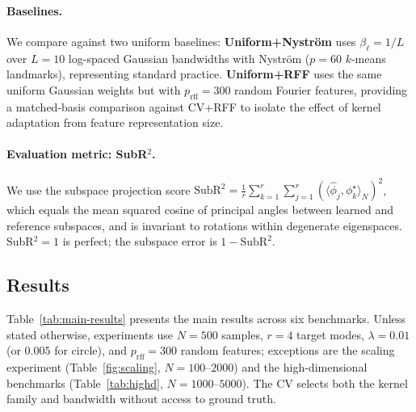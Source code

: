 \documentclass[11pt]{article}
\theoremstyle{remark}
\begin{document}
\paragraph{Baselines.}
We compare against two uniform baselines:
\textbf{Uniform+Nystr\"om} uses $\beta_\ell=1/L$ over $L=10$ log-spaced Gaussian bandwidths with Nystr\"om ($p=60$ $k$-means landmarks), representing standard practice.
\textbf{Uniform+RFF} uses the same uniform Gaussian weights but with $p_{\mathrm{rff}}=300$ random Fourier features, providing a matched-basis comparison against CV+RFF to isolate the effect of kernel adaptation from feature representation size.

\paragraph{Evaluation metric: SubR$^2$.}
We use the subspace projection score
$\mathrm{SubR}^2 = \frac{1}{r}\sum_{k=1}^r \sum_{j=1}^r (\langle\hat\phi_j,\phi_k^\star\rangle_N)^2$,
which equals the mean squared cosine of principal angles between learned and reference subspaces, and is invariant to rotations within degenerate eigenspaces.
SubR$^2=1$ is perfect; the subspace error is $1-\mathrm{SubR}^2$.

\subsection{Results}
\label{subsec:results}

Table~\ref{tab:main-results} presents the main results across six benchmarks.
Unless stated otherwise, experiments use $N=500$ samples, $r=4$ target modes, $\lambda=0.01$ (or $0.005$ for circle), and $p_{\mathrm{rff}}=300$ random features; exceptions are the scaling experiment (Table~\ref{fig:scaling}, $N=100$--$2000$) and the high-dimensional benchmarks (Table~\ref{tab:highd}, $N=1000$--$5000$).
The CV selects both the kernel family and bandwidth without access to ground truth.
\end{document}
